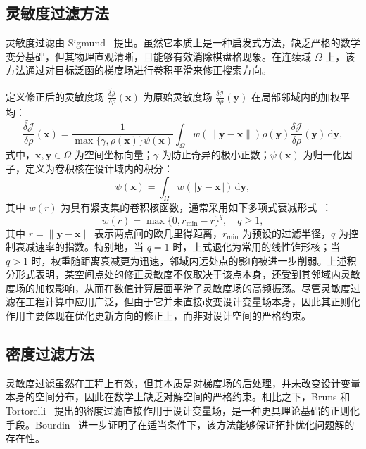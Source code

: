 \subsection{灵敏度过滤方法}
\label{subsec:filter_sensitivity}

灵敏度过滤由 Sigmund~\cite{sigmundDesignCompliantMechanisms1997a} 提出。虽然它本质上是一种启发式方法，缺乏严格的数学变分基础，但其物理直观清晰，且能够有效消除棋盘格现象。在连续域 $\Omega$ 上，该方法通过对目标泛函的梯度场进行卷积平滑来修正搜索方向。

定义修正后的灵敏度场 $\widetilde{\frac{\delta\mathcal{J}}{\delta\rho}}(\boldsymbol{x})$ 为原始灵敏度场 $\frac{\delta\mathcal{J}}{\delta\rho}(\boldsymbol{y})$ 在局部邻域内的加权平均：
\begin{equation} \label{eq:ch2_sensitivity_filter}
	\widetilde{\frac{\delta\mathcal{J}}{\delta\rho}}(\boldsymbol{x}) = \frac{1}{\max\{\gamma, \rho(\boldsymbol{x})\}\psi(\boldsymbol{x})}\int_{\Omega}w(\|\boldsymbol{y} - \boldsymbol{x}\|) \rho(\boldsymbol{y}) \frac{\delta\mathcal{J}}{\delta\rho}(\boldsymbol{y}) \, \mathrm{d}\boldsymbol{y},
\end{equation}
式中，$\boldsymbol{x}, \boldsymbol{y} \in \Omega$ 为空间坐标向量；$\gamma$ 为防止奇异的极小正数；$\psi(\boldsymbol{x})$ 为归一化因子，定义为卷积核在设计域内的积分：
\[
\psi(\boldsymbol{x}) = \int_{\Omega}w(\Vert\boldsymbol{y}-\boldsymbol{x}\Vert)\,\mathrm{d}\boldsymbol{y},
\]
其中 $w(r)$ 为具有紧支集的卷积核函数，通常采用如下多项式衰减形式~\cite{brunsTopologyOptimizationNonlinear2001, bourdinFiltersTopologyOptimization2001}：
\[
w(r) = \max\{0, r_{\min} - r\}^q, \quad q \geq 1,
\]
其中 $r = \|\boldsymbol{y} - \boldsymbol{x}\|$ 表示两点间的欧几里得距离，$r_{\min}$ 为预设的过滤半径，$q$ 为控制衰减速率的指数。特别地，当 $q = 1$ 时，上式退化为常用的线性锥形核；当 $q > 1$ 时，权重随距离衰减更为迅速，邻域内远处点的影响被进一步削弱。上述积分形式表明，某空间点处的修正灵敏度不仅取决于该点本身，还受到其邻域内灵敏度场的加权影响，从而在数值计算层面平滑了灵敏度场的高频振荡。尽管灵敏度过滤在工程计算中应用广泛，但由于它并未直接改变设计变量场本身，因此其正则化作用主要体现在优化更新方向的修正上，而非对设计空间的严格约束。


\subsection{密度过滤方法}
\label{subsec:filter_density}

灵敏度过滤虽然在工程上有效，但其本质是对梯度场的后处理，并未改变设计变量本身的空间分布，因此在数学上缺乏对解空间的严格约束。相比之下，Bruns 和 Tortorelli~\cite{brunsTopologyOptimizationNonlinear2001} 提出的密度过滤直接作用于设计变量场，是一种更具理论基础的正则化手段。Bourdin~\cite{bourdinFiltersTopologyOptimization2001} 进一步证明了在适当条件下，该方法能够保证拓扑优化问题解的存在性。

